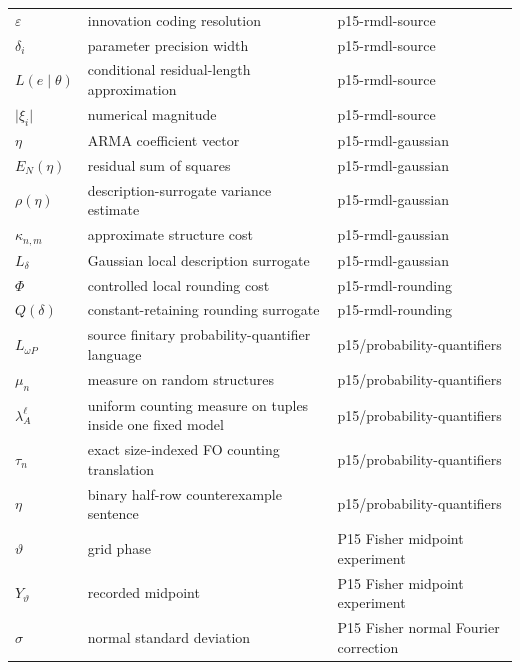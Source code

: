 \begin{longtable}{@{}p{}p{}p{}@{}}
\(\varepsilon\) & innovation coding resolution & p15-\allowbreak{}rmdl-\allowbreak{}source \\
\(\delta_i\) & parameter precision width & p15-\allowbreak{}rmdl-\allowbreak{}source \\
\(L(e\mid\theta)\) & conditional residual-length approximation & p15-\allowbreak{}rmdl-\allowbreak{}source \\
\(\lvert\xi_i\rvert\) & numerical magnitude & p15-\allowbreak{}rmdl-\allowbreak{}source \\
\(\eta\) & ARMA coefficient vector & p15-\allowbreak{}rmdl-\allowbreak{}gaussian \\
\(E_N(\eta)\) & residual sum of squares & p15-\allowbreak{}rmdl-\allowbreak{}gaussian \\
\(\rho(\eta)\) & description-surrogate variance estimate & p15-\allowbreak{}rmdl-\allowbreak{}gaussian \\
\(\kappa_{n,m}\) & approximate structure cost & p15-\allowbreak{}rmdl-\allowbreak{}gaussian \\
\(L_\delta\) & Gaussian local description surrogate & p15-\allowbreak{}rmdl-\allowbreak{}gaussian \\
\(\Phi\) & controlled local rounding cost & p15-\allowbreak{}rmdl-\allowbreak{}rounding \\
\(Q(\delta)\) & constant-retaining rounding surrogate & p15-\allowbreak{}rmdl-\allowbreak{}rounding \\
\(L_{\omega P}\) & source finitary probability-quantifier language & p15/\allowbreak{}probability-\allowbreak{}quantifiers \\
\(\mu_n\) & measure on random structures & p15/\allowbreak{}probability-\allowbreak{}quantifiers \\
\(\lambda_A^\ell\) & uniform counting measure on tuples inside one fixed model & p15/\allowbreak{}probability-\allowbreak{}quantifiers \\
\(\tau_n\) & exact size-indexed FO counting translation & p15/\allowbreak{}probability-\allowbreak{}quantifiers \\
\(\eta\) & binary half-row counterexample sentence & p15/\allowbreak{}probability-\allowbreak{}quantifiers \\
\(\vartheta\) & grid phase & P15 Fisher midpoint experiment \\
\(Y_\vartheta\) & recorded midpoint & P15 Fisher midpoint experiment \\
\(\sigma\) & normal standard deviation & P15 Fisher normal Fourier correction \\

\end{longtable}
